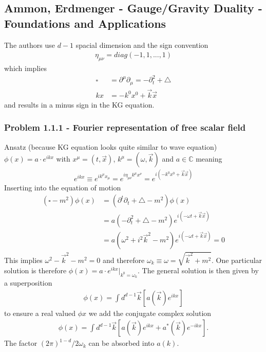 \documentclass[10pt,a4paper]{article}
\theoremstyle{definition}
\begin{document}
\subsection{{\sc Ammon, Erdmenger} - Gauge/Gravity Duality - Foundations and Applications}
The authors use $d-1$ spacial dimension and the sign convention 
\begin{align}
\eta_{\mu\nu}=diag(-1,1,...,1)
\end{align}
which implies 
\begin{align}
    \square&=\partial^\mu\partial_\mu=-\partial_t^2+\triangle\\
    kx&=-k^0x^0+\vec{k}\vec{x}
\end{align}
and results in a minus sign in the KG equation.

\subsubsection{Problem 1.1.1 - Fourier representation of free scalar field}
Ansatz (because KG equation looks quite similar to wave equation) $\phi(x)=a\cdot e^{ikx}$ with $x^\mu=(t,\vec{x})$, $k^\mu=(\omega,\vec{k})$ and $a\in\mathbb{C}$ meaning 
\begin{align}
    e^{ikx}\equiv e^{ik^{\mu}x_{\mu}}=e^{i\eta_{\mu\nu}k^{\mu}x^{\nu}}=e^{i(-k^0x^0+\vec{k}\vec{x})}
\end{align}
Inserting into the equation of motion
\begin{align}
    (\square - m^2)\phi(x)&=(\partial^t\partial_t + \triangle - m^2)\phi(x)\\
    &=a(-\partial_t^2 + \triangle - m^2)e^{i(-\omega t+\vec{k}\vec{x})}\\
    &=a\left(\omega^2 + i^2\vec{k}^2 - m^2\right)e^{i(-\omega t+\vec{k}\vec{x})}=0 
\end{align}
This implies $\omega^2-\vec{k}^2-m^2=0$ and therefore $\omega_k\equiv\omega=\sqrt{\vec{k}^2+m^2}$. One particular solution is therefore $\phi(x)=a\cdot e^{ikx}|_{k^0=\omega_k}$. The general solution is then given by a superposition
\begin{align}
    \phi(x)=\int d^{d-1}\vec{k}\left[a(\vec{k})e^{ikx}\right]
\end{align}
to ensure a real valued $\phi{x}$ we add the conjugate complex solution
\begin{align}
    \phi(x)=\int d^{d-1}\vec{k}\left[a(\vec{k})e^{ikx} + a^*(\vec{k})e^{-ikx}\right].
\end{align}
The factor $(2\pi)^{1-d}/2\omega_k$ can be absorbed into $a(k)$.
\end{document}
